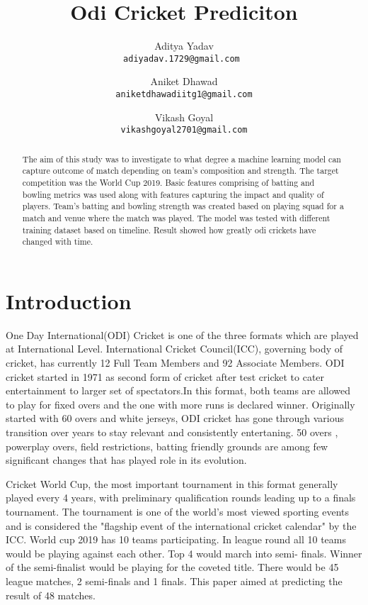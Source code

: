 \documentclass[a4paper]{article}
\title{Odi Cricket Prediciton}
\author{Aditya Yadav\\ 
\texttt{adiyadav.1729@gmail.com }\and
Aniket Dhawad\\
\texttt{aniketdhawadiitg1@gmail.com} \and
Vikash Goyal \\
\texttt{vikashgoyal2701@gmail.com}}
\begin{document}
\maketitle

\begin{abstract}
The aim of this study was to investigate to what degree a machine learning model can capture outcome of match depending on team's composition and strength. The target competition was the World Cup 2019.   Basic features comprising of batting and bowling metrics was used along with features capturing the impact and quality of players. Team's batting and bowling strength was created based on playing squad for a match and venue where the match was played. 
The model was tested with different training dataset based on timeline. Result showed how greatly odi crickets have changed with time. 
\end{abstract}

\section{Introduction}

One Day International(ODI) Cricket is one of the three formats which are played at International Level. International Cricket Council(ICC), governing body of cricket, has  currently 12  Full Team Members and 92 Associate Members. 
ODI cricket started in 1971 as second form of cricket after test cricket to cater entertainment to larger set of spectators.In this format, both teams are allowed to play for fixed overs and the one with more runs is declared winner. Originally started with 60 overs and white jerseys, ODI cricket has gone through various transition over years  
to stay relevant and consistently entertaning. 50 overs , powerplay overs, field restrictions, batting friendly grounds are among few significant changes that has played role in its evolution.

Cricket World Cup, the most important tournament in this format generally played every 4 years, with preliminary qualification rounds leading up to a finals tournament. The tournament is one of the world's most viewed sporting events and is considered the "flagship event of the international cricket calendar" by the ICC.  World cup 2019 has 10 teams participating. In league round all 10 teams would be playing against each other. Top 4 would march into semi- finals. Winner of the semi-finalist would be playing for the coveted title. There would be 45 league matches, 2 semi-finals and 1 finals. This paper aimed at predicting the result of 48 matches.
\end{document}
